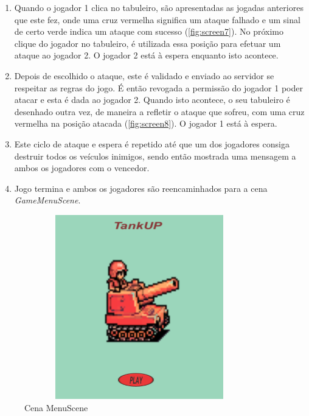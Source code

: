 \begin{enumerate}
    \item Quando o jogador 1 clica no tabuleiro, são apresentadas as jogadas anteriores que este fez, onde uma cruz vermelha significa um ataque falhado e um sinal de certo verde indica um ataque com sucesso (\autoref{fig:screen7}). No próximo clique do jogador no tabuleiro, é utilizada essa posição para efetuar um ataque ao jogador 2. O jogador 2 está à espera enquanto isto acontece. 
    \item Depois de escolhido o ataque, este é validado e enviado ao servidor se respeitar as regras do jogo. É então revogada a permissão do jogador 1 poder atacar e esta é dada ao jogador 2. Quando isto acontece, o seu tabuleiro é desenhado outra vez, de maneira a refletir o ataque que sofreu, com uma cruz vermelha na posição atacada (\autoref{fig:screen8}). O jogador 1 está à espera.
    \item Este ciclo de ataque e espera é repetido até que um dos jogadores consiga destruir todos os veículos inimigos, sendo então mostrada uma mensagem a ambos os jogadores com o vencedor.
    \item Jogo termina e ambos os jogadores são reencaminhados para a cena \emph{GameMenuScene}. 
\end{enumerate}
 
 \begin{figure}[!h]
    \includegraphics[width=10cm, height=8cm]{sceen1.png}
    \centering
    \caption{Cena MenuScene}
    \label{fig:screen1}
\end{figure}

